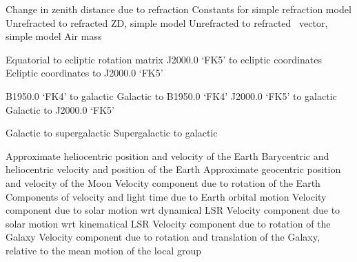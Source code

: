 \begin{callset}
   Change in zenith distance due to refraction
   Constants for simple refraction model
   Unrefracted to refracted ZD, simple model
   Unrefracted to refracted \azel\ vector, simple model
   Air mass
\end{callset}

\begin{callset}
   Equatorial to ecliptic rotation matrix
   J2000.0 `FK5' to ecliptic coordinates
   Ecliptic coordinates to J2000.0 `FK5'
\end{callset}

\begin{callset}
   B1950.0 `FK4' to galactic
   Galactic to B1950.0 `FK4'
   J2000.0 `FK5' to galactic
   Galactic to J2000.0 `FK5'
\end{callset}

\begin{callset}
   Galactic to supergalactic
   Supergalactic to galactic
\end{callset}

\begin{callset}
   Approximate heliocentric position and velocity of the Earth
   Barycentric and heliocentric velocity and position of the Earth
   Approximate geocentric position and velocity of the Moon
   Velocity component due to rotation of the Earth
   Components of velocity and light time due to Earth orbital motion
   Velocity component due to solar motion wrt dynamical LSR
   Velocity component due to solar motion wrt kinematical LSR
   Velocity component due to rotation of the Galaxy
   Velocity component due to rotation and translation of the
   Galaxy, relative to the mean motion of the local group
\end{callset}

